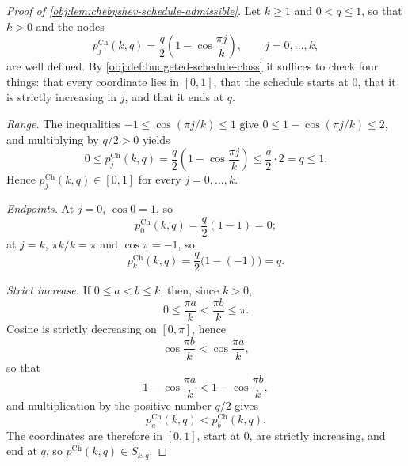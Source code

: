 \begin{proof}[Proof of \cref{obj:lem:chebyshev-schedule-admissible}]
Let \(k\ge1\) and \(0<q\le1\), so that \(k>0\) and the nodes
\[
p^{\mathrm{Ch}}_j(k,q)=\frac q2\left(1-\cos\frac{\pi j}{k}\right),
\qquad j=0,\ldots,k,
\]
are well defined. By \cref{obj:def:budgeted-schedule-class} it suffices to check four things: that every coordinate lies in \([0,1]\), that the schedule starts at \(0\), that it is strictly increasing in \(j\), and that it ends at \(q\).

\emph{Range.}
The inequalities \(-1\le \cos(\pi j/k)\le1\) give \(0\le 1-\cos(\pi j/k)\le2\), and multiplying by \(q/2>0\) yields
\[
0
\le
p^{\mathrm{Ch}}_j(k,q)
=
\frac q2\left(1-\cos\frac{\pi j}{k}\right)
\le
\frac q2\cdot 2
=
q
\le
1 .
\]
Hence \(p^{\mathrm{Ch}}_j(k,q)\in[0,1]\) for every \(j=0,\ldots,k\). %

\emph{Endpoints.}
At \(j=0\), \(\cos 0=1\), so
\[
p^{\mathrm{Ch}}_0(k,q)=\frac q2(1-1)=0 ;
\]
at \(j=k\), \(\pi k/k=\pi\) and \(\cos\pi=-1\), so
\[
p^{\mathrm{Ch}}_k(k,q)=\frac q2\bigl(1-(-1)\bigr)=q .
\] %

\emph{Strict increase.}
If \(0\le a<b\le k\), then, since \(k>0\),
\[
0\le \frac{\pi a}{k}<\frac{\pi b}{k}\le \pi .
\]
Cosine is strictly decreasing on \([0,\pi]\), hence
\[
\cos\frac{\pi b}{k}<\cos\frac{\pi a}{k},
\]
so that
\[
1-\cos\frac{\pi a}{k}
<
1-\cos\frac{\pi b}{k},
\]
and multiplication by the positive number \(q/2\) gives
\[
p^{\mathrm{Ch}}_a(k,q)<p^{\mathrm{Ch}}_b(k,q).
\] %
The coordinates are therefore in \([0,1]\), start at \(0\), are strictly increasing, and end at \(q\), so \(p^{\mathrm{Ch}}(k,q)\in S_{k,q}\). %
\end{proof}
